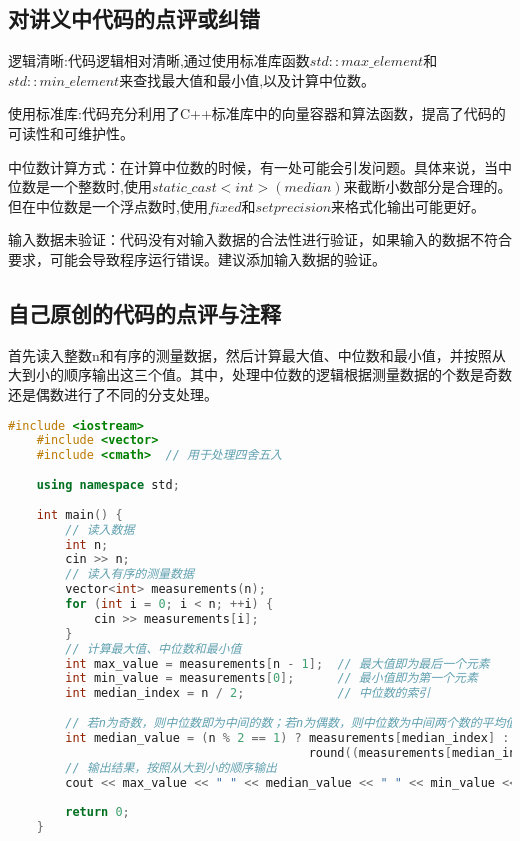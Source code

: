 \subsection{对讲义中代码的点评或纠错}
逻辑清晰:代码逻辑相对清晰,通过使用标准库函数$std::max\_element$和$std::min\_element$来查找最大值和最小值,以及计算中位数。

使用标准库:代码充分利用了C++标准库中的向量容器和算法函数，提高了代码的可读性和可维护性。

中位数计算方式：在计算中位数的时候，有一处可能会引发问题。具体来说，当中位数是一个整数时,使用$static\_cast<int>(median)$来截断小数部分是合理的。但在中位数是一个浮点数时,使用$fixed$和$setprecision$来格式化输出可能更好。

输入数据未验证：代码没有对输入数据的合法性进行验证，如果输入的数据不符合要求，可能会导致程序运行错误。建议添加输入数据的验证。
\subsection{自己原创的代码的点评与注释}

首先读入整数n和有序的测量数据，然后计算最大值、中位数和最小值，并按照从大到小的顺序输出这三个值。其中，处理中位数的逻辑根据测量数据的个数是奇数还是偶数进行了不同的分支处理。

\begin{lstlisting}[language=C++]
    #include <iostream>
    #include <vector>
    #include <cmath>  // 用于处理四舍五入
    
    using namespace std;
    
    int main() {
        // 读入数据
        int n;
        cin >> n;
        // 读入有序的测量数据
        vector<int> measurements(n);
        for (int i = 0; i < n; ++i) {
            cin >> measurements[i];
        }
        // 计算最大值、中位数和最小值
        int max_value = measurements[n - 1];  // 最大值即为最后一个元素
        int min_value = measurements[0];      // 最小值即为第一个元素
        int median_index = n / 2;             // 中位数的索引
    
        // 若n为奇数，则中位数即为中间的数；若n为偶数，则中位数为中间两个数的平均值
        int median_value = (n % 2 == 1) ? measurements[median_index] :
                                          round((measurements[median_index - 1] + measurements[median_index]) / 2.0);
        // 输出结果，按照从大到小的顺序输出
        cout << max_value << " " << median_value << " " << min_value << endl;
    
        return 0;
    }    
\end{lstlisting}
